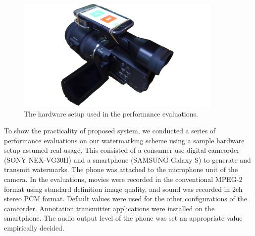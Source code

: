 \begin{figure}[htbp]
 \begin{center}
  \includegraphics[width=100mm]{evaluation_environment.pdf}
 \end{center}
 \caption{The hardware setup used in the performance evaluations.}
 \label{fig:eval_conv}
\end{figure}

To show the practicality of proposed system, we conducted a series of performance evaluations on our watermarking scheme using a sample hardware setup assumed real usage.
This consisted of a consumer-use digital camcorder (SONY NEX-VG30H) and a smartphone (SAMSUNG Galaxy S) to generate and transmit watermarks.
The phone was attached to the microphone unit of the camera.
In the evaluations, movies were recorded in the conventional MPEG-2 format using standard definition image quality, and sound was recorded in 2ch stereo PCM format.
Default values were used for the other configurations of the camcorder.
Annotation transmitter applications were installed on the smartphone.
The audio output level of the phone was set an appropriate value empirically decided.
